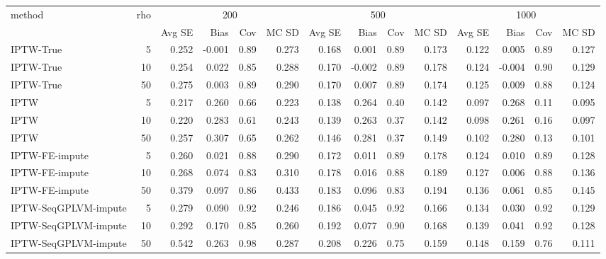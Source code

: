 \begin{tabular}{l r|rrrr|rrrr|rrrr}
\toprule
method & rho & \multicolumn{4}{c|}{200} & \multicolumn{4}{c|}{500} & \multicolumn{4}{c}{1000} \\
 &  & Avg SE & Bias & Cov & MC SD & Avg SE & Bias & Cov & MC SD & Avg SE & Bias & Cov & MC SD \\
\midrule
IPTW-True & 5 & 0.252 & -0.001 & 0.89 & 0.273 & 0.168 & 0.001 & 0.89 & 0.173 & 0.122 & 0.005 & 0.89 & 0.127 \\
IPTW-True & 10 & 0.254 & 0.022 & 0.85 & 0.288 & 0.170 & -0.002 & 0.89 & 0.178 & 0.124 & -0.004 & 0.90 & 0.129 \\
IPTW-True & 50 & 0.275 & 0.003 & 0.89 & 0.290 & 0.170 & 0.007 & 0.89 & 0.174 & 0.125 & 0.009 & 0.88 & 0.124 \\
IPTW & 5 & 0.217 & 0.260 & 0.66 & 0.223 & 0.138 & 0.264 & 0.40 & 0.142 & 0.097 & 0.268 & 0.11 & 0.095 \\
IPTW & 10 & 0.220 & 0.283 & 0.61 & 0.243 & 0.139 & 0.263 & 0.37 & 0.142 & 0.098 & 0.261 & 0.16 & 0.097 \\
IPTW & 50 & 0.257 & 0.307 & 0.65 & 0.262 & 0.146 & 0.281 & 0.37 & 0.149 & 0.102 & 0.280 & 0.13 & 0.101 \\
IPTW-FE-impute & 5 & 0.260 & 0.021 & 0.88 & 0.290 & 0.172 & 0.011 & 0.89 & 0.178 & 0.124 & 0.010 & 0.89 & 0.128 \\
IPTW-FE-impute & 10 & 0.268 & 0.074 & 0.83 & 0.310 & 0.178 & 0.016 & 0.88 & 0.189 & 0.127 & 0.006 & 0.88 & 0.136 \\
IPTW-FE-impute & 50 & 0.379 & 0.097 & 0.86 & 0.433 & 0.183 & 0.096 & 0.83 & 0.194 & 0.136 & 0.061 & 0.85 & 0.145 \\
IPTW-SeqGPLVM-impute & 5 & 0.279 & 0.090 & 0.92 & 0.246 & 0.186 & 0.045 & 0.92 & 0.166 & 0.134 & 0.030 & 0.92 & 0.129 \\
IPTW-SeqGPLVM-impute & 10 & 0.292 & 0.170 & 0.85 & 0.260 & 0.192 & 0.077 & 0.90 & 0.168 & 0.139 & 0.041 & 0.92 & 0.128 \\
IPTW-SeqGPLVM-impute & 50 & 0.542 & 0.263 & 0.98 & 0.287 & 0.208 & 0.226 & 0.75 & 0.159 & 0.148 & 0.159 & 0.76 & 0.111 \\
\bottomrule
\end{tabular}